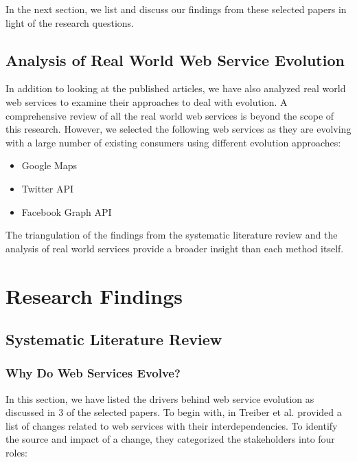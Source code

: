 \documentclass[runningheads,a4paper]{llncs}
\begin{document}
In the next section, we list and discuss our findings from these selected papers in light of the research questions.

\subsection{Analysis of Real World Web Service Evolution} %
\label{sub:analysis_of_real_world_web_service_evolution}
In addition to looking at the published articles, we have also analyzed real world web services to examine their approaches to deal with evolution. A comprehensive review of all the real world web services is beyond the scope of this research. However, we selected the following web services as they are evolving with a large number of existing consumers using different evolution approaches:

\begin{itemize}
  \item Google Maps
  \item Twitter API
  \item Facebook Graph API
\end{itemize}

The triangulation of the findings from the systematic literature review and the analysis of real world services provide a broader insight than each method itself.



\section{Research Findings} %
\label{sec:research_findings}

\subsection{Systematic Literature Review} %
\label{sub:literature_review}

\subsubsection{Why Do Web Services Evolve?} %
\label{sub:why_do_web_services_change}
In this section, we have listed the drivers behind web service evolution as discussed in 3 of the selected papers. To begin with, in \cite{treiber2009analyzing} Treiber et al. provided a list of changes related to web services with their interdependencies. To identify the source and impact of a change, they categorized the stakeholders into four roles:
\end{document}
